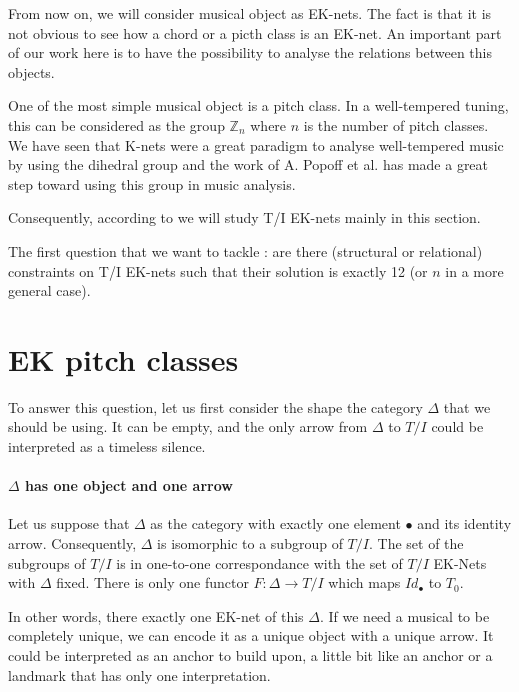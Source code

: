 

From now on, we will consider musical object as EK-nets. The fact is that it is not obvious to see how a chord or a picth class is an EK-net. An important part of our work here is to have the possibility to analyse the relations between this objects.

One of the most simple musical object is a pitch class. In a well-tempered tuning, this can be considered as the group $\mathbb{Z}_n$ where $n$ is the number of pitch classes. We have seen that K-nets were a great paradigm to analyse well-tempered music by using the dihedral group and the work of  A. Popoff et al.\cite{PAAE2016} has made a great step toward using this group in music analysis.

Consequently, according to  we will study T/I EK-nets mainly in this section.

The first question that we want to tackle : are there (structural or relational) constraints on T/I EK-nets such that their solution is exactly 12 (or $n$ in a more general case).

\section{EK pitch classes}

To answer this question, let us first consider the shape the category $\Delta$ that we should be using. It can be empty, and the only arrow from $\Delta$ to $T/I$ could be interpreted as a timeless silence.

\paragraph{$\Delta$ has one object and one arrow}
Let us suppose that $\Delta$ as the category with exactly one element $\bullet$ and its identity arrow. Consequently, $\Delta$ is isomorphic to a subgroup of $T/I$. The set of the subgroups of $T/I$ is in one-to-one correspondance with the set of $T/I$ EK-Nets with $\Delta$ fixed.
There is only one functor $F:\Delta \rightarrow T/I$ which maps $Id_\bullet$ to $T_0$.

In other words, there exactly one EK-net of this $\Delta$. If we need a musical to be completely unique, we can encode it as a unique object with a unique arrow. It could be interpreted as an anchor to build upon, a little bit like an anchor or a landmark that has only one interpretation.



